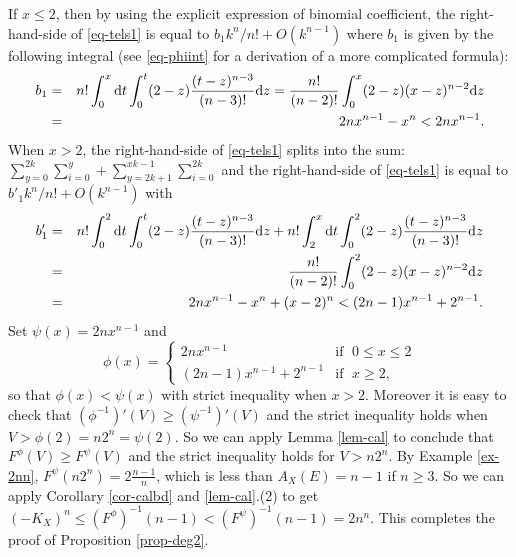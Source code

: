 \documentclass[12pt]{amsart}
\theoremstyle{definition}
\def\dif{{\rm d}}
\newcommand{\lee}{\leqslant}
\begin{document}
If $x\lee 2$, then by using the explicit expression of binomial coefficient, the right-hand-side of \eqref{eq-tels1} is equal to $b_1 k^n/n!+O(k^{n-1})$ where $b_1$ is given by the following integral (see \eqref{eq-phiint} for a derivation of a more complicated formula):
\begin{eqnarray*}
    b_1&=&n!\int_0^x \dif t\int_0^t  (2-z)\frac{(t-z)^{n-3}}{(n-3)!}\dif z
    = \frac{n!}{(n-2)!}\int_0^x (2-z)(x-z)^{n-2}\dif z\\
    &=&2n x^{n-1}- x^n<2n x^{n-1}.
\end{eqnarray*}
When $x> 2$, the right-hand-side of \eqref{eq-tels1} splits into the sum:
$\sum_{y=0}^{2k}\sum_{i=0}^{y}+\sum_{y=2k+1}^{xk-1}\sum_{i=0}^{2k}$ and the right-hand-side of \eqref{eq-tels1} is equal to $b'_1 k^n/n!+O(k^{n-1})$ with 
\begin{eqnarray*}
b'_1&=&n!\int_0^2 \dif t\int_0^t  (2-z)\frac{(t-z)^{n-3}}{(n-3)!}\dif z+n!\int_2^x \dif t \int_0^2 (2-z)\frac{(t-z)^{n-3}}{(n-3)!}\dif z\\
&=&\frac{n!}{(n-2)!}\int_0^2(2-z)(x-z)^{n-2}\dif z\\
&=&2 nx^{n-1}-x^n+(x-2)^n<(2n-1)x^{n-1}+2^{n-1}.
\end{eqnarray*}
Set $\psi(x)=2n x^{n-1}$ and 
\begin{equation}
   {\phi}(x)=
   \left\{\begin{array}{ll}
     2n x^{n-1} &  \text{if }\; 0\le x\le 2\\
    (2n-1)x^{n-1}+2^{n-1} & \text{if }\; x\ge 2, 
\end{array}
\right.
\end{equation}
so that $\phi(x)<\psi(x)$ with strict inequality when $x>2$. Moreover it is easy to check that $(\phi^{-1})'(V)\ge (\psi^{-1})'(V)$ and the strict inequality holds when $V>\phi(2)=n 2^{n}=\psi(2)$. So we can apply Lemma 
\ref{lem-cal} to conclude that $F^{\phi}(V)\ge F^{\psi}(V)$ and the strict inequality holds for $V> n 2^{n}$. By Example \ref{ex-2nn}, $F^\psi(n 2^{n})=2\frac{n-1}{n}$, which is less than $A_X(E)=n-1$ if $n\ge 3$. So we can apply 
Corollary \ref{cor-calbd} and \ref{lem-cal}.(2) to get $(-K_X)^n\le (F^{\phi})^{-1}(n-1)<(F^{\psi})^{-1}(n-1)=2n^n$. This completes the proof of Proposition \ref{prop-deg2}. 
\end{document}
